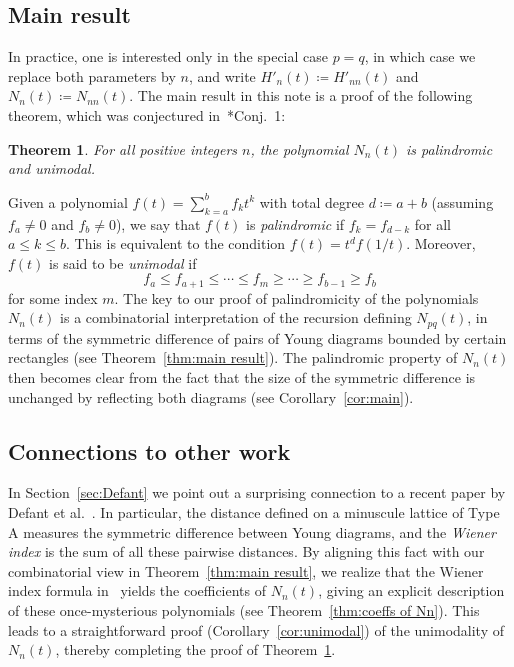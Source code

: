 \documentclass[11pt]{amsart}
\theoremstyle{plain}
\newtheorem{theorem}{Theorem}[section]
\theoremstyle{definition}
\numberwithin{equation}{section}
\begin{document}
\subsection{Main result}

In practice, one is interested only in the special case $p=q$, in which case we replace both parameters by $n$, and write $H'_n(t) \coloneqq H'_{nn}(t)$ and $N_{n}(t) \coloneqq N_{nn}(t)$.
The main result in this note is a proof of the following theorem, which was conjectured in~\cite{BW}*{Conj.~1}:

\begin{theorem}
\label{thm:main conjecture}
For all positive integers $n$, the polynomial $N_n(t)$ is palindromic and unimodal.
\end{theorem}

Given a polynomial $f(t) = \sum_{k=a}^b f_k t^k$ with total degree $d \coloneqq a+b$ (assuming $f_a \neq 0$ and $f_b \neq 0$), we say that $f(t)$ is \emph{palindromic} if $f_k = f_{d-k}$ for all $a \leq k \leq b$.
This is equivalent to the condition $f(t) = t^d f(1/t)$.
Moreover, $f(t)$ is said to be \emph{unimodal} if
\[
f_a \leq f_{a+1} \leq \cdots \leq f_m \geq \cdots \geq f_{b-1} \geq f_b
\]
for some index $m$.
The key to our proof of palindromicity of the polynomials $N_n(t)$ is a combinatorial interpretation of the recursion defining $N_{pq}(t)$, in terms of the symmetric difference of pairs of Young diagrams bounded by certain rectangles (see Theorem~\ref{thm:main result}).
The palindromic property of $N_n(t)$ then becomes clear from the fact that the size of the symmetric difference is unchanged by reflecting both diagrams (see Corollary~\ref{cor:main}).

\subsection{Connections to other work}

In Section~\ref{sec:Defant} we point out a surprising connection to a recent paper by Defant et al.~\cite{Defant}.
In particular, the distance defined on a minuscule lattice of Type A measures the symmetric difference between Young diagrams, and the \emph{Wiener index} is the sum of all these pairwise distances.
By aligning this fact with our combinatorial view in Theorem~\ref{thm:main result}, we realize that the Wiener index formula in~\cite{Defant} yields the coefficients of $N_n(t)$, giving an explicit description of these once-mysterious polynomials (see Theorem~\ref{thm:coeffs of Nn}).
This leads to a straightforward proof (Corollary~\ref{cor:unimodal}) of the unimodality of $N_n(t)$, thereby completing the proof of Theorem~\ref{thm:main conjecture}.
\end{document}
